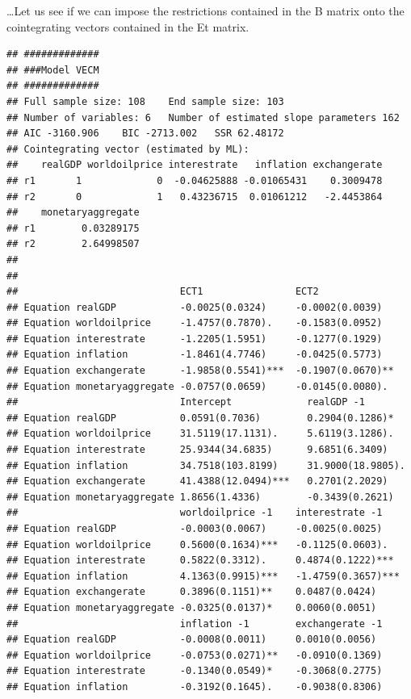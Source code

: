 \documentclass[11pt,preprint, authoryear]{elsarticle}
\numberwithin{equation}{section}
\numberwithin{figure}{section}
\numberwithin{table}{section}
\begin{document}
\ldots Let us see if we can impose the restrictions contained in the B
matrix onto the cointegrating vectors contained in the Et matrix.

\begin{verbatim}
## #############
## ###Model VECM 
## #############
## Full sample size: 108    End sample size: 103
## Number of variables: 6   Number of estimated slope parameters 162
## AIC -3160.906    BIC -2713.002   SSR 62.48172
## Cointegrating vector (estimated by ML):
##    realGDP worldoilprice interestrate   inflation exchangerate
## r1       1             0  -0.04625888 -0.01065431    0.3009478
## r2       0             1   0.43236715  0.01061212   -2.4453864
##    monetaryaggregate
## r1        0.03289175
## r2        2.64998507
## 
## 
##                            ECT1                ECT2               
## Equation realGDP           -0.0025(0.0324)     -0.0002(0.0039)    
## Equation worldoilprice     -1.4757(0.7870).    -0.1583(0.0952)    
## Equation interestrate      -1.2205(1.5951)     -0.1277(0.1929)    
## Equation inflation         -1.8461(4.7746)     -0.0425(0.5773)    
## Equation exchangerate      -1.9858(0.5541)***  -0.1907(0.0670)**  
## Equation monetaryaggregate -0.0757(0.0659)     -0.0145(0.0080).   
##                            Intercept             realGDP -1         
## Equation realGDP           0.0591(0.7036)        0.2904(0.1286)*    
## Equation worldoilprice     31.5119(17.1131).     5.6119(3.1286).    
## Equation interestrate      25.9344(34.6835)      9.6851(6.3409)     
## Equation inflation         34.7518(103.8199)     31.9000(18.9805).  
## Equation exchangerate      41.4388(12.0494)***   0.2701(2.2029)     
## Equation monetaryaggregate 1.8656(1.4336)        -0.3439(0.2621)    
##                            worldoilprice -1    interestrate -1    
## Equation realGDP           -0.0003(0.0067)     -0.0025(0.0025)    
## Equation worldoilprice     0.5600(0.1634)***   -0.1125(0.0603).   
## Equation interestrate      0.5822(0.3312).     0.4874(0.1222)***  
## Equation inflation         4.1363(0.9915)***   -1.4759(0.3657)*** 
## Equation exchangerate      0.3896(0.1151)**    0.0487(0.0424)     
## Equation monetaryaggregate -0.0325(0.0137)*    0.0060(0.0051)     
##                            inflation -1        exchangerate -1    
## Equation realGDP           -0.0008(0.0011)     0.0010(0.0056)     
## Equation worldoilprice     -0.0753(0.0271)**   -0.0910(0.1369)    
## Equation interestrate      -0.1340(0.0549)*    -0.3068(0.2775)    
## Equation inflation         -0.3192(0.1645).    -0.9038(0.8306)    

\end{verbatim}
\end{document}
